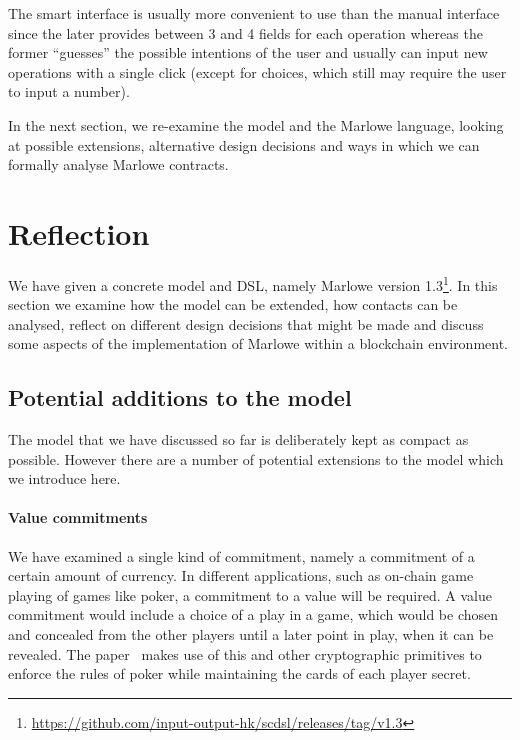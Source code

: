 \documentclass[runningheads]{llncs}
\begin{document}
The smart interface is usually more convenient to use than the manual
interface since the later provides between 3 and 4 fields for each
operation whereas the former ``guesses'' the possible intentions
of the user and usually can input new operations with a single click 
(except for choices, which still may require the user to input a number).


In the next section, we re-examine the model and the Marlowe language, looking at possible extensions, alternative 
design decisions and ways in which we can formally analyse Marlowe contracts.

\section{Reflection}
\label{section:reflection}

We have given a concrete model and DSL, namely Marlowe version 
1.3\footnote{\url{https://github.com/input-output-hk/scdsl/releases/tag/v1.3}}.
In this section we examine how the model can be extended, how contacts can be analysed, reflect on different design 
decisions that might be made and discuss some aspects of the implementation of Marlowe within a blockchain environment.

\subsection{Potential additions to the model}

The model that we have discussed so far is deliberately kept as compact as possible. However there are a number of 
potential extensions to the model which we introduce here. 

\paragraph{Value commitments}

We have examined a single kind of commitment, namely a commitment of a certain amount of currency. In different 
applications, such as on-chain game playing of games like poker, a commitment to a value will be required. A value 
commitment would include a choice of a play in a game, which would be chosen and concealed from the other players until 
a later point in play, when it can be revealed. The paper~\cite{kumaresan2015use} makes use of this and other 
cryptographic primitives to enforce the rules of poker while maintaining the cards of each player secret.
\end{document}
